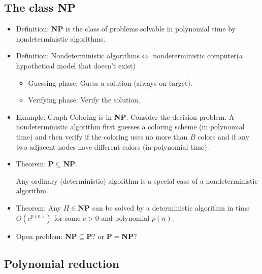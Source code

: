 \documentclass{article}
\begin{document}
\subsection{The class {\bf NP}}

\begin{itemize}

\item Definition: {\bf NP} is the class of problems solvable in 
polynomial time by nondeterministic algorithms.

\item Definition: Nondeterministic algorithms$\Leftrightarrow$
nondeterministic computer(a hypothetical model that doesn't exist)

\begin{itemize}

\item Guessing phase: Guess a solution (always on target).

\item Verifying phase: Verify the solution.

\end{itemize}

\item Example: Graph Coloring is in {\bf NP}. Consider the decision
problem. A nondeterministic algorithm first guesses a coloring scheme
(in polynomial time) and then verify if the coloring uses no more
than $B$ colors and if any two adjacent nodes have different colors
(in polynomial time). 

\item Theorem: {\bf P}$\subseteq${\bf NP}.

Any ordinary (deterministic) algorithm is a special case of
a nondeterministic algorithm.

\item Theorem: Any $\Pi\in${\bf NP} can be solved by a deterministic
algorithm in time $O(c^{p(n)})$ for some $c>0$ and polynomial $p(n)$.

\item Open problem: {\bf NP}$\subseteq${\bf P}? or
{\bf P}$=${\bf NP}? 

\end{itemize}

\subsection{Polynomial reduction}
\end{document}
